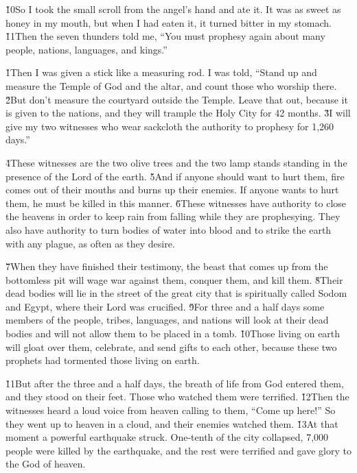 \v{10}So I took the small scroll from the angel's hand and ate it. It was as sweet as honey in my mouth, but when I had eaten it, it turned bitter in my stomach. \v{11}Then the seven thunders told me, ``You must prophesy again about many people, nations, languages, and kings.''

\v{1}Then I was given a stick like a measuring rod. I was told, ``Stand up and measure the Temple of God and the altar, and count those who worship there. \v{2}But don't measure the courtyard outside the Temple. Leave that out, because it is given to the nations, and they will trample the Holy City for 42 months. \v{3}I will give my two witnesses who wear sackcloth the authority to prophesy for 1,260 days.''

\v{4}These witnesses are the two olive trees and the two lamp stands standing in the presence of the Lord of the earth. \v{5}And if anyone should want to hurt them, fire comes out of their mouths and burns up their enemies. If anyone wants to hurt them, he must be killed in this manner. \v{6}These witnesses have authority to close the heavens in order to keep rain from falling while they are prophesying. They also have authority to turn bodies of water into blood and to strike the earth with any plague, as often as they desire.

\v{7}When they have finished their testimony, the beast that comes up from the bottomless pit will wage war against them, conquer them, and kill them. \v{8}Their dead bodies will lie in the street of the great city that is spiritually called Sodom and Egypt, where their Lord was crucified. \v{9}For three and a half days some members of the people, tribes, languages, and nations will look at their dead bodies and will not allow them to be placed in a tomb. \v{10}Those living on earth will gloat over them, celebrate, and send gifts to each other, because these two prophets had tormented those living on earth.

\v{11}But after the three and a half days, the breath of life from God entered them, and they stood on their feet. Those who watched them were terrified. \v{12}Then the witnesses heard a loud voice from heaven calling to them, ``Come up here!'' So they went up to heaven in a cloud, and their enemies watched them. \v{13}At that moment a powerful earthquake struck. One-tenth of the city collapsed, 7,000 people were killed by the earthquake, and the rest were terrified and gave glory to the God of heaven.

